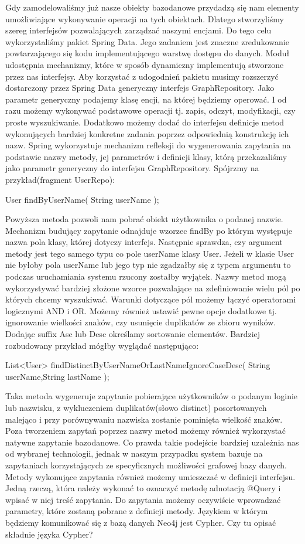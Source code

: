 Gdy zamodelowaliśmy już nasze obiekty bazodanowe przydadzą się nam elementy umożliwiające wykonywanie operacji na tych obiektach. Dlatego stworzyliśmy szereg interfejsów pozwalających zarządzać naszymi encjami. Do tego celu wykorzystaliśmy pakiet Spring Data. Jego zadaniem jest znaczne zredukowanie powtarzającego się kodu implementującego warstwę dostępu do danych. Moduł udostępnia mechanizmy, które w sposób dynamiczny implementują stworzone przez nas interfejsy. Aby korzystać z udogodnień pakietu musimy rozszerzyć dostarczony przez Spring Data generyczny interfejs GraphRepository. Jako parametr generyczny podajemy klasę encji, na której będziemy operować. I od razu możemy wykonywać podstawowe operacji tj. zapis, odczyt, modyfikacji, czy proste wyszukiwanie. Dodatkowo możemy dodać do interfejsu definicje metod wykonujących bardziej konkretne zadania poprzez odpowiednią konstrukcję ich nazw. Spring wykorzystuje mechanizm refleksji do wygenerowania zapytania na podstawie nazwy metody, jej parametrów i definicji klasy, którą przekazaliśmy jako parametr generyczny do interfejsu GraphRepository. Spójrzmy na przykład(fragment UserRepo):

User findByUserName( String userName );

Powyższa metoda pozwoli nam pobrać obiekt użytkownika o podanej nazwie. Mechanizm budujący zapytanie odnajduje wzorzec findBy po którym występuje nazwa pola klasy, której dotyczy interfejs. Następnie sprawdza, czy argument metody jest tego samego typu co pole userName klasy User. Jeżeli w klasie User nie byłoby pola userName lub jego typ nie zgadzałby się z typem argumentu to podczas uruchamiania systemu rzucony zostałby wyjątek. 
Nazwy metod mogą wykorzystywać bardziej złożone wzorce pozwalające na zdefiniowanie wielu pól po których chcemy wyszukiwać. Warunki dotyczące pól możemy łączyć operatorami logicznymi AND i OR.  Możemy również ustawić pewne opcje dodatkowe tj. ignorowanie wielkości znaków, czy usunięcie duplikatów ze zbioru wyników. Dodając suffix Asc lub Desc określamy sortowanie elementów. Bardziej rozbudowany przykład mógłby wyglądać następująco:

List<User> findDistinctByUserNameOrLastNameIgnoreCaseDesc( String userName,String lastName );

Taka metoda wygeneruje zapytanie pobierające użytkowników o podanym loginie lub nazwisku, z wykluczeniem duplikatów(słowo distinct) posortowanych malejąco i przy porównywaniu nazwiska zostanie pominięta wielkość znaków. 
Poza tworzeniem zapytań poprzez nazwy metod możemy również wykorzystać natywne zapytanie bazodanowe. Co prawda takie podejście bardziej uzależnia nas od wybranej technologii, jednak w naszym przypadku system bazuje na zapytaniach korzystających ze specyficznych możliwości grafowej bazy danych. Metody wykonujące zapytania również możemy umieszczać w definicji interfejsu. Jedną rzeczą, która należy wykonać to oznaczyć metodę adnotacją @Query i wpisać w niej treść zapytania. Do zapytania możemy oczywiście wprowadzać parametry, które zostaną pobrane z definicji metody. Językiem w którym będziemy komunikować się z bazą danych Neo4j jest Cypher. 
Czy tu opisać składnie języka Cypher?

